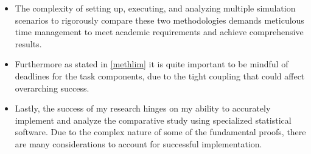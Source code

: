 \begin{itemize}
    \item The complexity of setting up, executing, and analyzing multiple simulation scenarios to rigorously compare these two methodologies demands meticulous time management to meet academic requirements and achieve comprehensive results.
    \item Furthermore as stated in \ref{methlim} it is quite important to be mindful of deadlines for the task components, due to the tight coupling that could affect overarching success.
    \item Lastly, the success of my research hinges on my ability to accurately implement and analyze the comparative study using specialized statistical software. Due to the complex nature of some of the fundamental proofs, there are many considerations to account for successful implementation.
\end{itemize}



